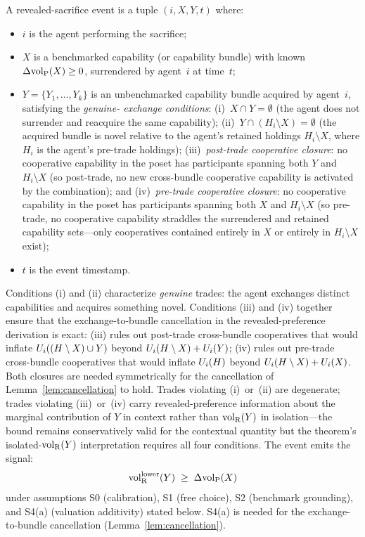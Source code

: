 \begin{definition}
\label{def:sacrifice_event}
A revealed-sacrifice event is a tuple $(i, X, Y, t)$ where:
\begin{itemize}
\item $i$ is the agent performing the sacrifice;
\item $X$ is a benchmarked capability (or capability bundle) with
  known $\Delta{\operatorname{vol}_{\mathrm{P}}}(X) \geq 0$, surrendered by agent~$i$ at
  time~$t$;
\item $Y = \{Y_1, \ldots, Y_k\}$ is an unbenchmarked capability
  bundle acquired by agent~$i$, satisfying the \emph{genuine-
  exchange conditions}:
  (i)~$X \cap Y = \emptyset$ (the agent does not surrender and
  reacquire the same capability);
  (ii)~$Y \cap (H_i \setminus X) = \emptyset$ (the acquired
  bundle is novel relative to the agent's retained holdings
  $H_i \setminus X$, where $H_i$ is the agent's pre-trade
  holdings);
  (iii)~\emph{post-trade cooperative closure}: no cooperative
  capability in the poset has participants spanning both $Y$
  and $H_i \setminus X$ (so post-trade, no new cross-bundle
  cooperative capability is activated by the combination);
  and
  (iv)~\emph{pre-trade cooperative closure}: no cooperative
  capability in the poset has participants spanning both $X$
  and $H_i \setminus X$ (so pre-trade, no cooperative
  capability straddles the surrendered and retained
  capability sets---only cooperatives contained entirely in
  $X$ or entirely in $H_i \setminus X$ exist);
\item $t$ is the event timestamp.
\end{itemize}
Conditions (i) and (ii) characterize \emph{genuine} trades: the
agent exchanges distinct capabilities and acquires something
novel.  Conditions (iii) and (iv) together ensure that the
exchange-to-bundle cancellation in the revealed-preference
derivation is exact: (iii) rules out post-trade cross-bundle
cooperatives that would inflate $U_i((H \setminus X) \cup Y)$
beyond $U_i(H \setminus X) + U_i(Y)$; (iv) rules out pre-trade
cross-bundle cooperatives that would inflate $U_i(H)$ beyond
$U_i(H \setminus X) + U_i(X)$.  Both closures are needed
symmetrically for the cancellation of
Lemma~\ref{lem:cancellation} to hold.  Trades violating
(i)~or~(ii) are degenerate; trades violating (iii)~or~(iv) carry
revealed-preference information about the marginal contribution
of $Y$ in context rather than ${\operatorname{vol}_{\mathrm{R}}}(Y)$ in isolation---the bound
remains conservatively valid for the contextual quantity but
the theorem's isolated-${\operatorname{vol}_{\mathrm{R}}}(Y)$ interpretation requires all
four conditions.
The event emits the signal:
\[
  {\operatorname{vol}_{\mathrm{R}}^{\mathrm{lower}}}(Y) \;\geq\; \Delta{\operatorname{vol}_{\mathrm{P}}}(X)
\]
under assumptions S0 (calibration), S1 (free choice), S2
(benchmark grounding), and S4(a) (valuation additivity) stated
below.  S4(a) is needed for the exchange-to-bundle cancellation
(Lemma~\ref{lem:cancellation}).
\end{definition}

